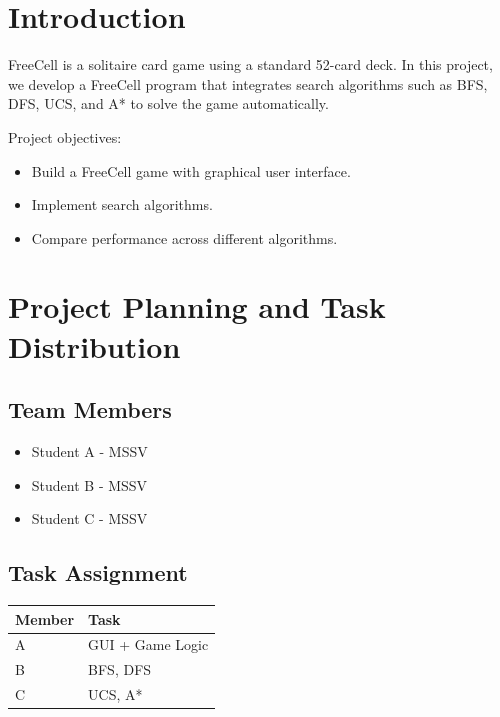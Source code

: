 \documentclass[12pt,a4paper]{article}
\begin{document}


\pagestyle{empty}
\tableofcontents
\newpage

\pagestyle{fancy}

\section{Introduction}
FreeCell is a solitaire card game using a standard 52-card deck. 
In this project, we develop a FreeCell program that integrates 
search algorithms such as BFS, DFS, UCS, and A* to solve the 
game automatically.

Project objectives:
\begin{itemize}
    \item Build a FreeCell game with graphical user interface.
    \item Implement search algorithms.
    \item Compare performance across different algorithms.
\end{itemize}

\section{Project Planning and Task Distribution}

\subsection{Team Members}
\begin{itemize}
    \item Student A - MSSV
    \item Student B - MSSV
    \item Student C - MSSV
\end{itemize}

\subsection{Task Assignment}
\begin{table}[H]
\centering
\begin{tabular}{ll}
\toprule
\textbf{Member} & \textbf{Task} \\
\midrule
A & GUI + Game Logic \\
B & BFS, DFS \\
C & UCS, A* \\
\bottomrule
\end{tabular}
\end{table}
\end{document}
